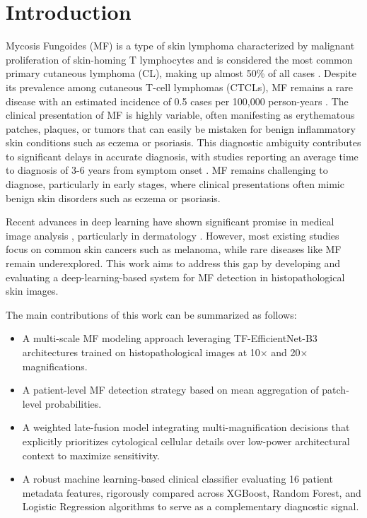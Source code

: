 \documentclass[conference]{IEEEtran}
\begin{document}
\section{Introduction}
Mycosis Fungoides (MF) is a type of skin lymphoma characterized by malignant proliferation of skin-homing T
lymphocytes and is considered the most common primary cutaneous lymphoma (CL), making up 
almost 50\% of all cases \cite{willemze2005}. Despite its prevalence among cutaneous
T-cell lymphomas (CTCLs), MF remains a rare disease with an estimated incidence of 0.5 cases per 
100,000 person-years \cite{willemze2005}.
The clinical presentation of MF is highly variable, often manifesting as erythematous patches, 
plaques, or tumors that can easily be mistaken for
benign inflammatory skin conditions such as eczema or psoriasis. This diagnostic ambiguity contributes to significant delays in accurate diagnosis,
with studies reporting an average time to diagnosis of 3-6 years from symptom onset \cite{beatty2025_early_mf_diagnosis}.
MF remains challenging to diagnose, particularly in early stages, where clinical presentations often mimic benign skin disorders such as eczema or psoriasis.

Recent advances in deep learning have shown significant promise in medical image
analysis \cite{litjens2017deep}, particularly in dermatology \cite{esteva2017dermatologist}.
However, most existing studies
focus on common skin cancers such as melanoma, while rare diseases like MF remain underexplored. This work aims to address this gap by developing and evaluating a
deep-learning-based system for MF detection in histopathological skin images.

The main contributions of this work can be summarized as follows:
\begin{itemize}
    \item A multi-scale MF modeling approach leveraging TF-EfficientNet-B3 architectures trained on histopathological images at 10$\times$ and 20$\times$ magnifications.
    \item A patient-level MF detection strategy based on mean aggregation of patch-level probabilities.
    \item A weighted late-fusion model integrating multi-magnification decisions that explicitly prioritizes cytological cellular details over low-power architectural context to maximize sensitivity.
    \item A robust machine learning-based clinical classifier evaluating 16 patient metadata features, rigorously compared across XGBoost, Random Forest, and Logistic Regression algorithms to serve as a complementary diagnostic signal.
\end{itemize}
\end{document}
